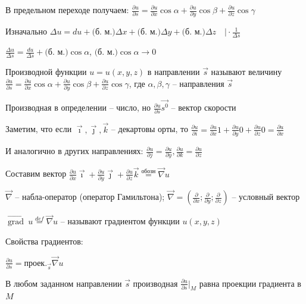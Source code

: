 \documentclass[12pt]{article}
\begin{document}
    В предельном переходе получаем: $\frac{\partial u}{\partial s} = \frac{\partial u}{\partial x} \cos\alpha + \frac{\partial u}{\partial y} \cos\beta + \frac{\partial u}{\partial z} \cos\gamma$

    \Nota Изначально $\Delta u = du + \text{(б. м.)} \Delta x + \text{(б. м.)} \Delta y + \text{(б. м.)} \Delta z \quad \Big| \cdot \frac{1}{\Delta s}$

    $\frac{\Delta u}{\Delta s} = \frac{du}{\Delta s} + \text{(б. м.)} \cos\alpha$, $\text{(б. м.)} \cos\alpha \rightarrow 0$

    \hypertarget{derivativeoffunctionindirection}{}

    \Def Производной функции $u = u(x, y, z)$ в направлении $\vec{s}$ называют величину $\frac{\partial u}{\partial s} = \frac{\partial u}{\partial x} \cos\alpha + \frac{\partial u}{\partial y} \cos\beta + \frac{\partial u}{\partial z} \cos\gamma$, где $\alpha, \beta, \gamma$ -- направления $\vec{s}$

    \Nota Производная в определении -- число, но $\frac{\partial u}{\partial s} \vec{s^0}$ -- вектор скорости

    \Nota Заметим, что если $\vec \imath, \vec \jmath, \vec{k}$ -- декартовы орты, то
    $\frac{\partial u}{\partial i} = \frac{\partial u}{\partial x} 1 + \frac{\partial u}{\partial y} 0 + \frac{\partial u}{\partial z} 0 = \frac{\partial u}{\partial x}$

    И аналогично в других направлениях: $\frac{\partial u}{\partial j} = \frac{\partial u}{\partial y}, \frac{\partial u}{\partial k} = \frac{\partial u}{\partial z}$

    Составим вектор $\frac{\partial u}{\partial x} \vec \imath + \frac{\partial u}{\partial y} \vec \jmath + \frac{\partial u}{\partial z} \vec k \stackrel{\text{обозн}}{=} \vec\nabla u$

    \hypertarget{gradientdefinition}{}

    $\vec\nabla$ -- набла-оператор (оператор Гамильтона); $\vec\nabla = \left(\frac{\partial}{\partial x}; \frac{\partial}{\partial y}; \frac{\partial}{\partial z}\right)$ -- условный вектор

    \Def $\overrightarrow{\operatorname{grad}} \ u \stackrel{def}{=} \vec\nabla u$ -- называют градиентом функции $u(x, y, z)$

    \hypertarget{gradientproperties}{}

    Свойства градиентов:

    \begin{MyTheorem}
         $\frac{\partial u}{\partial s} = \text{проек.}_{\vec{s}} \vec\nabla u$

        В любом заданном направлении $\overrightarrow{s}$ производная $\frac{\partial u}{\partial s} |_M$ равна проекции градиента в $M$
    \end{MyTheorem}
\end{document}
